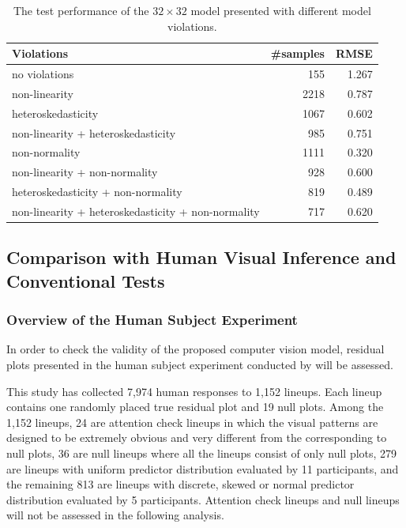 \documentclass[]{interact}
\theoremstyle{plain}%
\theoremstyle{definition}
\theoremstyle{remark}
\begin{document}
\begin{table}

\caption{\label{tab:performance-sub}The test performance of the $32 \times 32$ model presented with different model violations.}
\centering
\begin{tabular}[t]{lrr}
\toprule
Violations & \#samples & RMSE\\
\midrule
no violations & 155 & 1.267\\
non-linearity & 2218 & 0.787\\
heteroskedasticity & 1067 & 0.602\\
non-linearity + heteroskedasticity & 985 & 0.751\\
non-normality & 1111 & 0.320\\
non-linearity + non-normality & 928 & 0.600\\
heteroskedasticity + non-normality & 819 & 0.489\\
non-linearity + heteroskedasticity + non-normality & 717 & 0.620\\
\bottomrule
\end{tabular}
\end{table}

\subsection{Comparison with Human Visual Inference and Conventional
Tests}\label{comparison-with-human-visual-inference-and-conventional-tests}

\subsubsection{Overview of the Human Subject
Experiment}\label{overview-of-the-human-subject-experiment}

In order to check the validity of the proposed computer vision model,
residual plots presented in the human subject experiment conducted by
\citet{li2024plot} will be assessed.

This study has collected 7,974 human responses to 1,152 lineups. Each
lineup contains one randomly placed true residual plot and 19 null
plots. Among the 1,152 lineups, 24 are attention check lineups in which
the visual patterns are designed to be extremely obvious and very
different from the corresponding to null plots, 36 are null lineups
where all the lineups consist of only null plots, 279 are lineups with
uniform predictor distribution evaluated by 11 participants, and the
remaining 813 are lineups with discrete, skewed or normal predictor
distribution evaluated by 5 participants. Attention check lineups and
null lineups will not be assessed in the following analysis.
\end{document}
